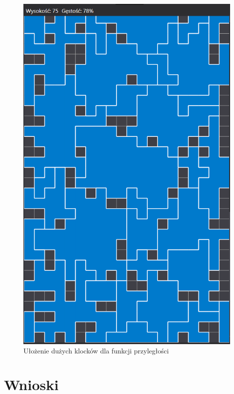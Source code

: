 \documentclass{article}
\begin{document}
\begin{enumerate}
\begin{figure}[H]
\includegraphics[width=\textwidth]{duze_klocki.PNG}
\caption{Ułożenie dużych klocków dla funkcji przyległości}
\end{figure}

\end{enumerate}
\section{Wnioski} %
\end{document}
